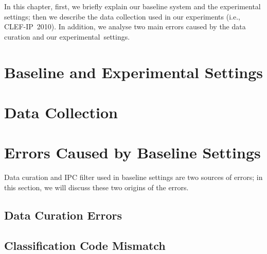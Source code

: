 \label{cha:BaselineIRFramework}
In this chapter, first, we briefly explain our baseline system and the experimental settings; 
then we describe the data collection used in our experiments (i.e., CLEF-IP~2010). In addition, we analyse two main errors caused by the data curation and our experimental~settings.
\section{Baseline and Experimental Settings}
\label{sec:settings}

\section{Data Collection}
\label{sec:DataCollection}

\section{Errors Caused by Baseline Settings}
Data curation and IPC filter used in baseline settings are two sources of errors;
in this section, we will discuss these two origins of the errors.

\subsection{Data Curation Errors}
\label{sec:DataCurationErrors}

\subsection{Classification Code Mismatch}
\label{sec:ClassificationCodeMismatch}

%
